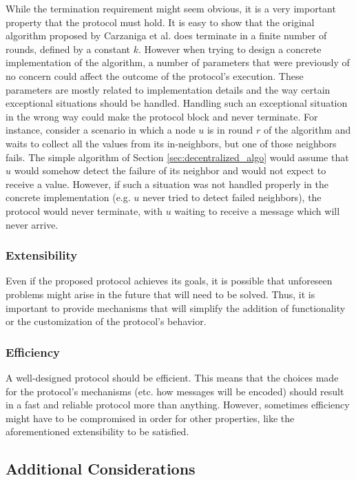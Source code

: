 \documentclass[a4paper,11pt,twoside]{report}
\begin{document}
While the termination requirement might seem obvious, it is a very important property that the protocol must hold. It is easy to show that the original algorithm proposed by Carzaniga et al. does terminate in a finite number of rounds, defined by a constant $k$. However when trying to design a concrete implementation of the algorithm, a number of parameters that were previously of no concern could affect the outcome of the protocol's execution. These parameters are mostly related to implementation details and the way certain exceptional situations should be handled. Handling such an exceptional situation in the wrong way could make the protocol block and never terminate. For instance, consider a scenario in which a node $u$ is in round $r$ of the algorithm and waits to collect all the values from its in-neighbors, but one of those neighbors fails. The simple algorithm of Section \ref{sec:decentralized_algo} would assume that $u$ would somehow detect the failure of its neighbor and would not expect to receive a value. However, if such a situation was not handled properly in the concrete implementation (e.g. $u$ never tried to detect failed neighbors), the protocol would never terminate, with $u$ waiting to receive a message which will never arrive.


\subsubsection*{Extensibility}

Even if the proposed protocol achieves its goals, it is possible that unforeseen problems might arise in the future that will need to be solved. Thus, it is important to provide mechanisms that will simplify the addition of functionality or the customization of the protocol's behavior.

\subsubsection*{Efficiency}

A well-designed protocol should be efficient. This means that the choices made for the protocol's mechanisms (etc. how messages will be encoded) should result in a fast and reliable protocol more than anything. However, sometimes efficiency might have to be compromised in order for other properties, like the aforementioned extensibility to be satisfied.

\subsection{Additional Considerations}
\end{document}
